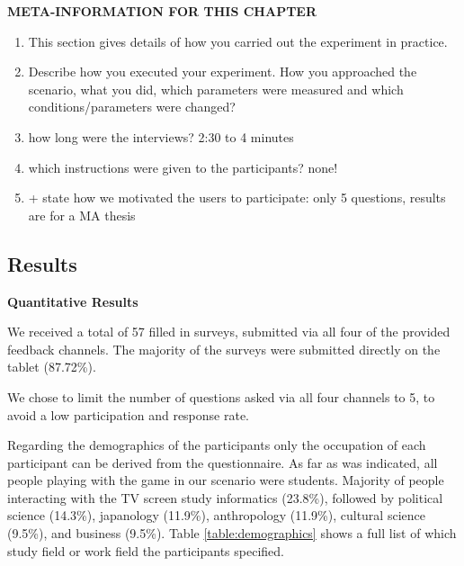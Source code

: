 		\textbf{META-INFORMATION FOR THIS CHAPTER}
		\begin{enumerate}
			\item This section gives details of how you carried out the experiment in practice.
			\item Describe how you executed your experiment. How you approached the scenario, what you did, which parameters were measured and which conditions/parameters were changed? 
			\item how long were the interviews? 2:30 to 4 minutes
			\item which instructions were given to the participants? none! 
			\item + state how we motivated the users to participate: only 5 questions, results are for a MA thesis
		\end{enumerate}








\subsection{Results}


\textbf{Quantitative Results}




	We received a total of 57 filled in surveys, submitted via all four of the provided feedback channels. The majority of the surveys were submitted directly on the tablet (87.72\%). 


	We chose to limit the number of questions asked via all four channels to 5, to avoid a low participation and response rate. 

	Regarding the demographics of the participants only the occupation of each participant can be derived from the questionnaire. As far as was indicated, all people playing with the game in our scenario were students. Majority of people interacting with the TV screen study informatics (23.8\%), followed by political science (14.3\%), japanology (11.9\%), anthropology (11.9\%), cultural science (9.5\%), and business (9.5\%). Table \ref{table:demographics} shows a full list of which study field or work field the participants specified.

